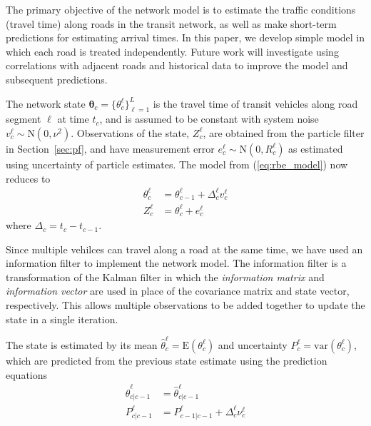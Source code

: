 The primary objective of the network model is to estimate the \rt traffic conditions
(travel time) along roads in the transit network, 
as well as make short-term predictions for estimating arrival times.
In this paper, we develop simple model in which each road is treated independently.
Future work will investigate using correlations with adjacent roads and historical data
to improve the model and subsequent predictions.


The network state $\boldsymbol\theta_c = \{\theta_c^\ell\}_{\ell = 1}^L$ is the travel time 
of transit vehicles along road segment $\ell$ at time $t_c$,
and is assumed to be constant with system noise $v_c^\ell \sim \mathrm{N}(0, \nu^2)$.
Observations of the state, $Z_c^\ell$, are obtained from the particle filter in Section~\ref{sec:pf},
and have measurement error $e_c^\ell \sim \mathrm{N}(0, R_c^\ell)$ as estimated 
using uncertainty of particle estimates.
The model from (\ref{eq:rbe_model}) now reduces to
\begin{equation}
\begin{split}
\theta_c^\ell &= \theta_{c-1}^\ell + \Delta_c^\ell v_c^\ell \\
Z_c^\ell &= \theta_c^\ell + e_c^\ell
\end{split}
\end{equation}
where $\Delta_c = t_c - t_{c-1}$.


Since multiple vehilces can travel along a road at the same time,
we have used an information filter to implement the network model.
The information filter is a transformation of the Kalman filter in which the
\emph{information matrix} and \emph{information vector} are used in place of 
the covariance matrix and state vector, respectively.
This allows multiple observations to be added together to update the state
in a single iteration.



The state is estimated by its mean $\hat \theta_c^\ell = \mathrm{E}(\theta_c^\ell)$
and uncertainty $P_c^\ell = \mathrm{var}(\theta_c^\ell)$,
which are predicted from the previous state estimate using the prediction
equations
\begin{align*}
\label{eq:kf_transition}
\hat \theta^\ell_{c|c-1} &= \hat \theta^\ell_{c|c-1} \\
P^\ell_{c|c-1} &= P^\ell_{c-1|c-1} + \Delta_c^\ell \nu_c^\ell
\end{align*}

